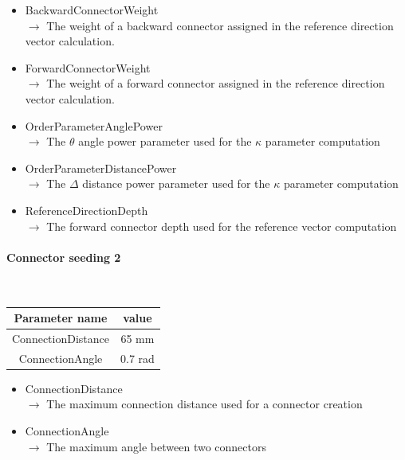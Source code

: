 \documentclass[cits]{JINST}
\begin{document}
\begin{itemize}
  \item BackwardConnectorWeight \\
  $\rightarrow$ The weight of a backward connector assigned in the reference direction vector calculation.
  \item ForwardConnectorWeight \\
  $\rightarrow$ The weight of a forward connector assigned in the reference direction vector calculation.
  \item OrderParameterAnglePower \\
  $\rightarrow$ The $\theta$ angle power parameter used for the $\kappa$ parameter computation
  \item OrderParameterDistancePower \\
  $\rightarrow$ The $\Delta$ distance power parameter used for the $\kappa$ parameter computation
  \item ReferenceDirectionDepth \\
  $\rightarrow$ The forward connector depth used for the reference vector computation
\end{itemize}


\paragraph{Connector seeding 2} ~

\begin{table}[!ht]
  \begin{center}
    \begin{tabu} to \linewidth { c | c } 
          Parameter name & value \\
          \hline
          ConnectionDistance & 65 mm \\
          ConnectionAngle & 0.7 rad
    \end{tabu} 
  \end{center}
\end{table}

\begin{itemize}
  \item ConnectionDistance \\
  $\rightarrow$ The maximum connection distance used for a connector creation
  \item ConnectionAngle \\
  $\rightarrow$ The maximum angle between two connectors
\end{itemize}


\newpage
\end{document}
